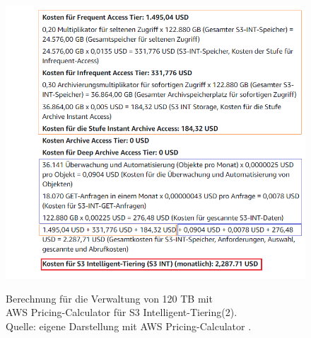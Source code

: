 \begin{figure}[h!]
  \centering
  \includegraphics[scale=0.6]{sources/S3_INT_2}
  \caption[Berechnung für die Verwaltung von 120 TB mit AWS Pricing-Calculator für S3 Intelligent-Tiering(2)]{}
  \label{fig:INT_S3_2} Berechnung für die Verwaltung von 120 TB mit\\ AWS Pricing-Calculator für S3 Intelligent-Tiering(2).\\
  Quelle: eigene Darstellung mit AWS Pricing-Calculator \cite{AMZ17-S3}.
\end{figure}
\\\\
